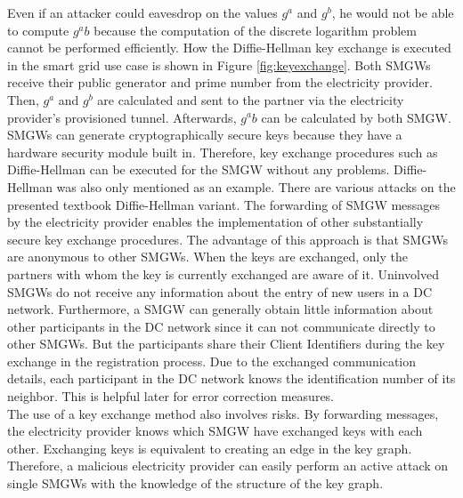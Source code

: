 Even if an attacker could eavesdrop on the values $g^a$ and $g^b$, he would not be able to compute $g^ab$ because the computation of the discrete logarithm problem cannot be performed efficiently. How the Diffie-Hellman key exchange is executed in the smart grid use case is shown in Figure \ref{fig:keyexchange}. 
Both \gls{SMGW}s receive their public generator and prime number from the electricity provider. Then, $g^a$ and $g^b$ are calculated and sent to the partner via the electricity provider's provisioned tunnel. Afterwards, $g^ab$ can be calculated by both \gls{SMGW}.\\
\gls{SMGW}s can generate cryptographically secure keys because they have a hardware security module built in. Therefore, key exchange procedures such as Diffie-Hellman can be executed for the \gls{SMGW} without any problems. Diffie-Hellman was also only mentioned as an example. There are various attacks on the presented textbook Diffie-Hellman variant.
The forwarding of \gls{SMGW} messages by the electricity provider enables the implementation of other substantially secure key exchange procedures. The advantage of this approach is that \gls{SMGW}s are anonymous to other \gls{SMGW}s. When the keys are exchanged, only the partners with whom the key is currently exchanged are aware of it. Uninvolved \gls{SMGW}s do not receive any information about the entry of new users in a DC network. Furthermore, a \gls{SMGW} can generally obtain little information about other participants in the DC network since it can not communicate directly to other \gls{SMGW}s. But the participants share their Client Identifiers during the key exchange in the registration process. Due to the exchanged communication details, each participant in the DC network knows the identification number of its neighbor. This is helpful later for error correction measures. %
\\The use of a key exchange method also involves risks. By forwarding messages, the electricity provider knows which \gls{SMGW} have exchanged keys with each other. Exchanging keys is equivalent to creating an edge in the key graph. %
Therefore, a malicious electricity provider can easily perform an active attack on single \gls{SMGW}s with the knowledge of the structure of the key graph. %

